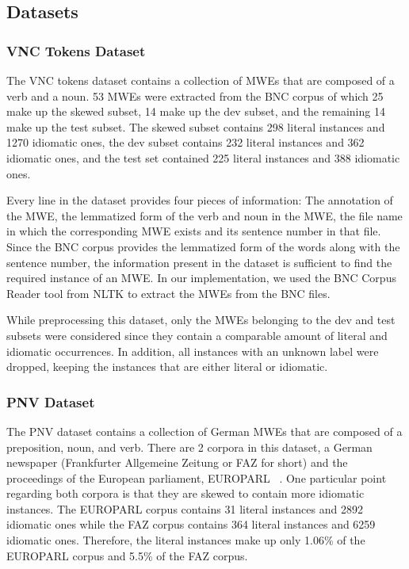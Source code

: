 \documentclass[11pt]{article}
\begin{document}
\subsection{Datasets}

\subsubsection{VNC Tokens Dataset}


The VNC tokens dataset contains a collection of MWEs that are composed of a verb and a noun. 53 MWEs were extracted from the BNC corpus of which 25 make up the skewed subset, 14 make up the dev subset, and the remaining 14 make up the test subset. The skewed subset contains 298 literal instances and 1270 idiomatic ones, the dev subset contains 232 literal instances and 362 idiomatic ones, and the test set contained 225 literal instances and 388 idiomatic ones.

Every line in the dataset provides four pieces of information: The annotation of the MWE, the lemmatized form of the verb and noun in the MWE, the file name in which the corresponding MWE exists and its sentence number in that file. Since the BNC corpus provides the lemmatized form of the words along with the sentence number, the information present in the dataset is sufficient to find the required instance of an MWE. In our implementation, we used the BNC Corpus Reader tool from NLTK to extract the MWEs from the BNC files. 

While preprocessing this dataset, only the MWEs belonging to the dev and test subsets were considered since they contain a comparable amount of literal and idiomatic occurrences. In addition, all instances with an unknown label were dropped, keeping the instances that are either literal or idiomatic. 

\subsubsection{PNV Dataset}

The PNV dataset contains a collection of German MWEs that are composed of a preposition, noun, and verb. There are 2 corpora in this dataset, a German newspaper (Frankfurter Allgemeine Zeitung or FAZ for short) and the proceedings of the European parliament, EUROPARL ~\cite{koehn2005europarl}. One particular point regarding both corpora is that they are skewed to contain more idiomatic instances. The EUROPARL corpus contains 31 literal instances and 2892 idiomatic ones while the FAZ corpus contains 364 literal instances and 6259 idiomatic ones. Therefore, the literal instances make up only 1.06\% of the EUROPARL corpus and 5.5\% of the FAZ corpus.  
\end{document}
